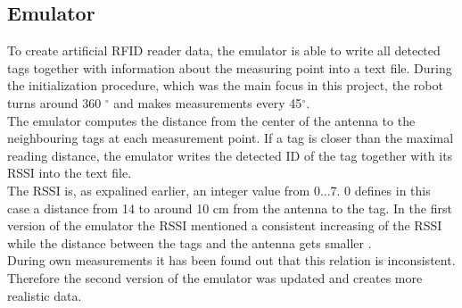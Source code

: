 \subsection{Emulator}
To create artificial RFID reader data, the emulator is able to write all detected tags together with information about the measuring point into a text file. During the initialization procedure, which was the main focus in this project, the robot turns around 360 $^\circ$ and makes measurements every 45$^\circ$. \\
The emulator computes the distance from the center of the antenna to the neighbouring tags at each measurement point. If a tag is closer than the maximal reading distance, the emulator writes the detected ID of the tag together with its RSSI into the text file. \\
The RSSI is, as expalined earlier, an integer value from 0...7. 0 defines in this case a distance from 14 to around 10 cm from the antenna to the tag. In the first version of the emulator the RSSI mentioned a consistent increasing of the RSSI while the distance between the tags and the antenna gets smaller \cite{ChristofRohrigDanielHessandFrankKunemund.}. \\
During own measurements it has been found out that this relation is inconsistent. Therefore the second version of the emulator was updated and creates more realistic data.\\


